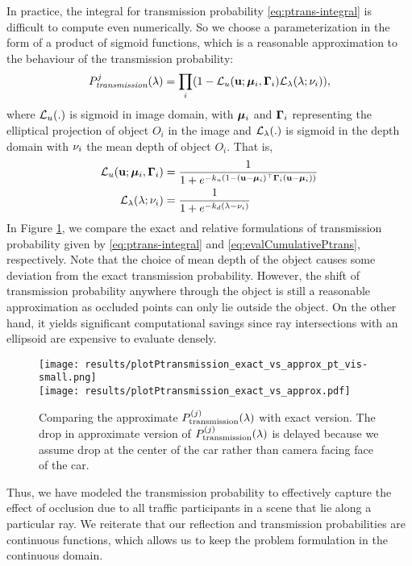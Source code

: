 In practice, the integral for transmission probability \eqref{eq:ptrans-integral} is difficult to compute even numerically. So we choose a parameterization in the form of a product of sigmoid functions, which is a reasonable approximation to the behaviour of the transmission probability:
%
\newcommand{\Ptransmission}{P_{\textit{transmission}}}%
\begin{align}
  \Ptransmission^j(\lambda) = \prod_i (1 - \cL_u (\bu; \bmu_i, \bGamma_i) \cL_{\lambda}(\lambda; \meandepth{i})),
\label{eq:evalCumulativePtrans}
\end{align}
%
where $\mathcal{L}_u(.)$ is sigmoid in image domain, with ${\bm{\mu}}_i$ and $\bm{\Gamma}_i$ representing the elliptical projection of object $O_i$ in the image and $\mathcal{L}_{\lambda}(.)$ is sigmoid in the depth domain with $\nu_i$ the mean depth of object $O_i$. That is,
%
\begin{align}
\mathcal{L}_u(\mathbf{u}; {\bm{\mu}}_i, \bm{\Gamma}_i) &= \frac{1}{1 + e^{-k_u(1 - (\mathbf{u} - {\bm{\mu}}_i)^\top \bm{\Gamma}_i (\mathbf{u} - {\bm{\mu}}_i))}} \\
  \mathcal{L}_{\lambda}(\lambda; \nu_i) &= \frac{1}{1 + e^{-k_d(\lambda - \nu_i)}}
\end{align}
%
In Figure \ref{fig:compare:exact:approx:ptrans}, we compare the exact and relative formulations of transmission probability given by \eqref{eq:ptrans-integral} and \eqref{eq:evalCumulativePtrans}, respectively. Note that the choice of mean depth of the object causes some deviation from the exact transmission probability. However, the shift of transmission probability anywhere through the object is still a reasonable approximation as occluded points can only lie outside the object. On the other hand, it yields significant computational savings since ray intersections with an ellipsoid are expensive to evaluate densely.


\begin{figure}
  \texttt{[image: results/plotPtransmission\_exact\_vs\_approx\_pt\_vis-small.png]}\\
  \texttt{[image: results/plotPtransmission\_exact\_vs\_approx.pdf]}
  \caption{Comparing the approximate $P^{(j)}_{\text{transmission}}(\lambda)$ with exact version. The drop in approximate version of $P^{(j)}_{\text{transmission}}(\lambda)$ is delayed because we assume drop at the center of the car rather than camera facing face of the car.}
  \label{fig:compare:exact:approx:ptrans}
\end{figure}

Thus, we have modeled the transmission probability to effectively capture the effect of occlusion due to all traffic participants in a scene that lie along a particular ray. We reiterate that our reflection and transmission probabilities are continuous functions, which allows us to keep the problem formulation in the continuous domain.
